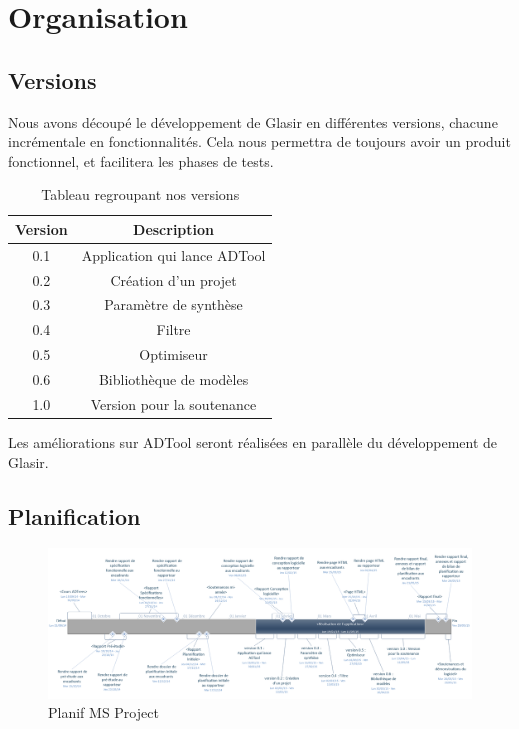 \section{Organisation}
	\subsection{Versions}
		Nous avons découpé le développement de Glasir en différentes versions, chacune incrémentale en fonctionnalités.
		Cela nous permettra de toujours avoir un produit fonctionnel, et facilitera les phases de tests.

		\begin{table}[h!]
			\begin{center}
			\begin{tabular}{|c|c|}
				\hline
				Version & Description\\
				\hline
				0.1 & Application qui lance ADTool\\
				\hline
				0.2 & Création d'un projet\\
				\hline
				0.3 & Paramètre de synthèse\\
				\hline
				0.4 & Filtre\\
				\hline
				0.5 & Optimiseur\\
				\hline
				0.6 & Bibliothèque de modèles\\
				\hline
				1.0 & Version pour la soutenance\\
				\hline
			\end{tabular}
			\end{center}
			\caption{Tableau regroupant nos versions}
		\end{table}

		Les améliorations sur ADTool seront réalisées en parallèle du développement de Glasir.

	\subsection{Planification}
		\begin{figure}
			\begin{center}
				\includegraphics[height=0.50\textwidth,angle=90]{figure/planification.png}
			\end{center}
			\caption{Planif MS Project}
			\label{fig:planif}
		\end{figure}


